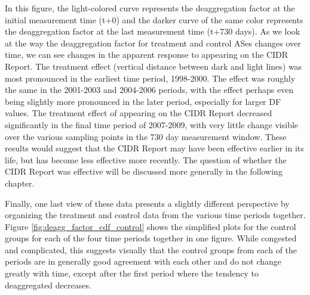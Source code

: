 In this figure, the light-colored curve represents the deaggregation factor at
the initial measurement time (t+0) and the darker curve of the same color
represents the deaggregation factor at the last measurement time (t+730 days).
As we look at the way the deaggregation factor for treatment and control ASes
changes over time, we can see changes in the apparent response to appearing on
the CIDR Report. The treatment effect (vertical distance between dark and light
lines) was most pronounced in the earliest time period, 1998-2000. The effect
was roughly the same in the 2001-2003 and 2004-2006 periods, with the effect
perhaps even being slightly more pronounced in the later period, especially for
larger DF values. The treatment effect of appearing on the CIDR Report
decreased significantly in the final time period of 2007-2009, with very little
change visible over the various sampling points in the 730 day measurement
window. These results would suggest that the CIDR Report may have been
effective earlier in its life, but has become less effective more recently. The
question of whether the CIDR Report was effective will be discussed more
generally in the following chapter.

Finally, one last view of these data presents a slightly different perspective
by organizing the treatment and control data from the various time periods
together. Figure \ref{fig:deagg_factor_cdf_control} shows the simplified plots
for the control groups for each of the four time periods together in one
figure. While congested and complicated, this suggests visually that the
control groups from each of the periods are in generally good agreement with
each other and do not change greatly with time, except after the first period
where the tendency to deaggregated decreases.

